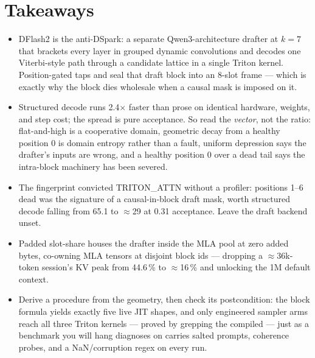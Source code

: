 \section*{Takeaways}

\begin{itemize}
  \item DFlash2 is the anti-DSpark: a separate Qwen3-architecture drafter
    at $k{=}7$ that brackets every layer in grouped dynamic convolutions
    and decodes one Viterbi-style path through a candidate lattice in a
    single Triton kernel. Position-gated taps and 
    seal that draft block into an 8-slot frame --- which is exactly why the
    block dies wholesale when a causal mask is imposed on it.
  \item Structured decode runs 2.4$\times$ faster than prose on identical
    hardware, weights, and step cost; the spread is pure acceptance. So
    read the \emph{vector}, not the ratio: flat-and-high is a cooperative
    domain, geometric decay from a healthy position 0 is domain entropy
    rather than a fault, uniform depression says the drafter's inputs are
    wrong, and a healthy position 0 over a dead tail says the intra-block
    machinery has been severed.
  \item The fingerprint convicted TRITON\_ATTN without a profiler:
    positions 1--6 dead was the signature of a causal-in-block draft mask,
    worth structured decode falling from 65.1 to $\approx$29 \tokspersec{}
    at 0.31 acceptance. Leave the draft backend unset.
  \item Padded slot-share houses the drafter inside the MLA pool at zero
    added bytes, co-owning MLA tensors at disjoint block ids --- dropping a
    $\approx$36k-token session's KV peak from 44.6\,\% to $\approx$16\,\%
    and unlocking the 1M default context.
  \item Derive a procedure from the geometry, then check its postcondition:
    the block formula yields exactly five live JIT shapes, and only
    engineered sampler arms reach all three Triton kernels --- proved by
    grepping the compiled  --- just as a benchmark you will
    hang diagnoses on carries salted prompts, coherence probes, and a
    NaN/corruption regex on every run.
\end{itemize}

